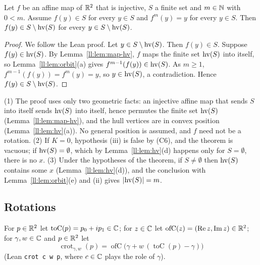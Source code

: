 \begin{lemma}\label{ll:lem:inv-sdiff}
Let $f$ be an affine map of $\mathbb R^2$ that is injective, $S$ a finite set and $m\in\mathbb N$ with $0<m$. Assume $f(y)\in S$ for
every $y\in S$ and $f^m(y)=y$ for every $y\in S$. Then $f(y)\in S\setminus\operatorname{hv}(S)$ for every $y\in S\setminus\operatorname{hv}(S)$.
\end{lemma}

\begin{proof}
We follow the Lean proof. Let $y\in S\setminus\operatorname{hv}(S)$. Then $f(y)\in S$. Suppose $f(y)\in\operatorname{hv}(S)$. By
Lemma~\ref{ll:lem:map-hv}, $f$ maps the finite set $\operatorname{hv}(S)$ into itself, so Lemma~\ref{ll:lem:orbit}(a) gives
$f^{m-1}(f(y))\in\operatorname{hv}(S)$. As $m\ge1$, $f^{m-1}(f(y))=f^m(y)=y$, so $y\in\operatorname{hv}(S)$, a contradiction. Hence
$f(y)\in S\setminus\operatorname{hv}(S)$.
\end{proof}

\begin{remark}\label{ll:rem:core}
(1) The proof uses only two geometric facts: an injective affine map that sends $S$ into itself sends $\operatorname{hv}(S)$ into
itself, hence permutes the finite set $\operatorname{hv}(S)$ (Lemma~\ref{ll:lem:map-hv}), and the hull vertices are in convex
position (Lemma~\ref{ll:lem:hv}(a)). No general
position is assumed, and $f$ need not be a rotation.
(2) If $K=0$, hypothesis (iii) is false by (C6), and the theorem is vacuous; if $\operatorname{hv}(S)=\emptyset$, which by
Lemma~\ref{ll:lem:hv}(d) happens only for $S=\emptyset$, there is no $x$.
(3) Under the hypotheses of the theorem, if $S\ne\emptyset$ then $\operatorname{hv}(S)$ contains some $x$ (Lemma~\ref{ll:lem:hv}(d)),
and the conclusion with Lemma~\ref{ll:lem:orbit}(e) and (ii) gives $\lvert\operatorname{hv}(S)\rvert=m$.
\end{remark}

\subsection{Rotations}

\begin{definition}\label{ll:def:complex}
For $p\in\mathbb R^2$ let $\operatorname{toC}(p)=p_0+ip_1\in\mathbb C$; for $z\in\mathbb C$ let $\operatorname{ofC}(z)=(\operatorname{Re}z,
\operatorname{Im}z)\in\mathbb R^2$; for $\gamma,w\in\mathbb C$ and $p\in\mathbb R^2$ let
\[\operatorname{crot}_{\gamma,w}(p)=\operatorname{ofC}\bigl(\gamma+w\,(\operatorname{toC}(p)-\gamma)\bigr)\]
(Lean \texttt{crot c w p}, where $c\in\mathbb C$ plays the role of $\gamma$).
\end{definition}

